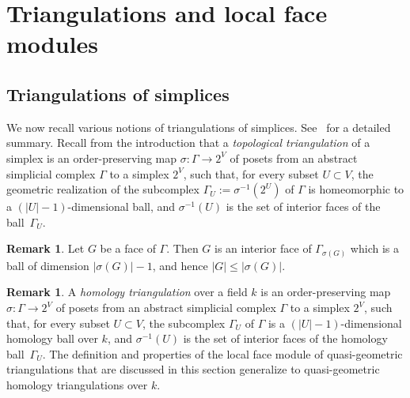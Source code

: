 \documentclass[11pt]{article}
\theoremstyle{definition}
\newtheorem{rema}[theo]{Remark}
\numberwithin{equation}{section}
\numberwithin{equation}{section}
\begin{document}
\section{Triangulations and local face modules}

\subsection{Triangulations of simplices}\label{sec:triang}

We now recall various notions of triangulations of simplices. See~\cite[Section 2]{AthanasiadisSurvey} for a detailed summary. 
Recall from the introduction that a \emph{topological triangulation} of a simplex is an order-preserving  map $\sigma \colon \Gamma \to 2^V$ of posets from an abstract simplicial complex $\Gamma$ to a simplex $2^V$, 
such that, for every subset $U \subset V$, 
the geometric realization of the
subcomplex $\Gamma_U := \sigma^{-1}(2^U)$ of $\Gamma$ is homeomorphic to a $(|U| - 1)$-dimensional ball, and $\sigma^{-1}(U)$ is the set of interior faces of the ball~$\Gamma_U$. 

\begin{rema}\label{rem:GleqsigmaG}
	Let $G$ be a face of $\Gamma$. Then 
$G$ is an interior face of $\Gamma_{\sigma(G)}$ which is a ball of dimension $|\sigma(G)| - 1$, and hence  $|G| \le |\sigma(G)|$. 
\end{rema}

\begin{rema}\label{rem:homology1}
A \emph{homology triangulation} over a field $k$ 
is an order-preserving  map $\sigma \colon \Gamma \to 2^V$ of posets from an abstract simplicial complex $\Gamma$ to a simplex $2^V$, 
such that, for every subset $U \subset V$, 
the
subcomplex $\Gamma_U$ of $\Gamma$ is a $(|U| - 1)$-dimensional homology ball over $k$, and $\sigma^{-1}(U)$ is the set of interior faces of the homology ball~$\Gamma_U$.
The definition and properties of the local face module of quasi-geometric triangulations that are discussed in this section generalize to quasi-geometric homology triangulations over $k$. 
\end{rema}
\end{document}
